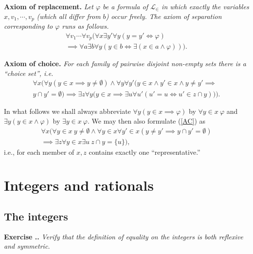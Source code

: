 \documentclass{book}
\newcommand{\titl}[1]{\noindent\textbf{#1}}
\newcounter{Exercise}[section]
\renewcommand{\theExercise}{\thesection.\arabic{Exercise}.}
\newcommand{\new}{\vspace{1.5em}\noindent\textbf{{Exercise \stepcounter{Exercise}\textbf{\theExercise}}} }
\begin{document}
\begin{framed}
\titl{Axiom of replacement.} \emph{Let $\varphi$ be a formula of $\mathscr{L}_{\in}$ in which exactly the variables $x,v_1,\cdots,v_p$ (which all differ from $b$) occur freely. The axiom of separation corresponding to $\varphi$ runs as follows.}
    \begin{gather*}
        \forall v_1\cdots\forall v_p(\forall x\exists y'\forall y(y=y'\iff\varphi)\\
        \implies\forall a\exists b\forall y(y\in b\iff\exists(x\in a\land\varphi))).\tag{Rep$_\varphi$}\label{Rep}
    \end{gather*}
\end{framed}

\begin{framed}
\titl{Axiom of choice.} \emph{For each family of pairwise disjoint non-empty sets there is a ``choice set'', i.e.}
    \begin{gather*}
        \forall x(\forall y(y\in x\implies y\neq\emptyset)\land\forall y\forall y'(y\in x\land y'\in x\land y\neq y'\implies \\
        y\cap y'=\emptyset)\implies\exists z\forall y\big(y\in x\implies\exists u\forall u'(u'=u\iff u'\in z\cap y))).\tag{AC}\label{AC}
    \end{gather*}
\end{framed}

In what follows we shall always abbreviate $\forall y(y\in x\implies\varphi)$ by $\forall y\in x\ \varphi$ and $\exists y(y\in x\land\varphi)$ by $\exists y\in x\ \varphi$. We may then also formulate (\ref{AC}) as
    \begin{gather*}
        \forall x(\forall y\in x\ y\neq\emptyset\land\forall y\in x\forall y'\in x(y\neq y'\implies y\cap y'=\emptyset)\\
        \implies\exists z\forall y\in x\exists u\ z\cap y=\{u\}),
    \end{gather*}
i.e., for each member of $x,z$ contains exactly one ``representative.''

\chapter{Integers and rationals}
\section{The integers}

\new\emph{Verify that the definition of equality on the integers is both reflexive and symmetric.}
\end{document}

